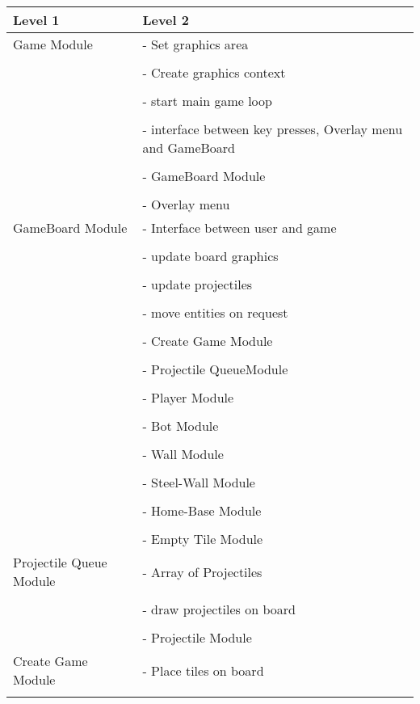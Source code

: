 \documentclass{article}
\begin{document}
\begin{tabularx}{\textwidth}{l X}
	
	Level 1 & Level 2\\
	\midrule
	Game Module & - Set graphics area\\ \\
	 & - Create graphics context\\ \\
	 & - start main game loop\\ \\
	 & - interface between key presses, Overlay menu and GameBoard\\ \\
	 & - GameBoard Module\\ \\
	 & - Overlay menu\\
	 \midrule
	 GameBoard Module & - Interface between user and game\\ \\
	 & - update board graphics\\ \\
	 & - update projectiles\\ \\
	 & - move entities on request\\ \\
	 & - Create Game Module \\ \\
	 & - Projectile  QueueModule \\ \\
	 & - Player Module\\ \\
	 & - Bot Module\\ \\
	 & - Wall Module\\ \\
	 & - Steel-Wall Module\\ \\
	 & - Home-Base Module\\ \\
	 & - Empty Tile Module\\
	  \midrule
	 Projectile  Queue Module & - Array of Projectiles \\ \\
	 & - draw projectiles on board\\ \\
	 & - Projectile Module\\
	  \midrule
	 Create Game Module & - Place tiles on board \\ \\

\end{tabularx}
\end{document}
